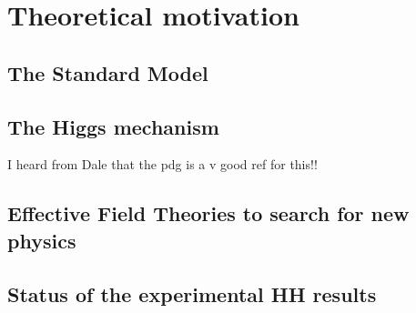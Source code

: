 \chapter{Theoretical motivation}

\section{The Standard Model}

\section{The Higgs mechanism}
I heard from Dale that the pdg is a v good ref for this!!

\section{Effective Field Theories to search for new physics}

\section{Status of the experimental HH results}

